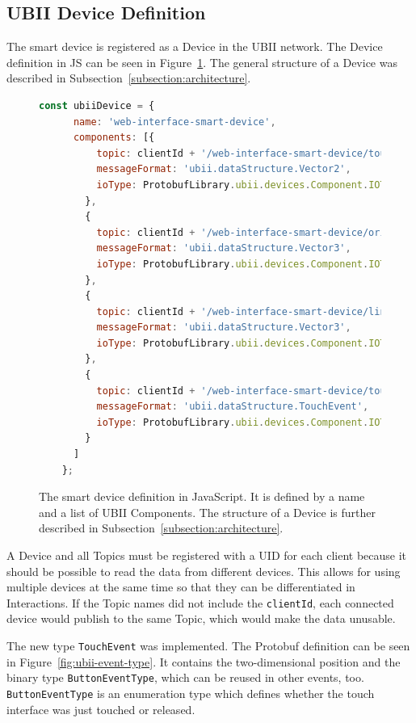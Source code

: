 \subsection{UBII Device Definition}\label{subsection:ubii-device-definition}

The smart device is registered as a Device in the \gls{UBII} network. The Device definition in \gls{JS} can be seen in Figure~\ref{fig:ubii-device-registration}. The general structure of a Device was described in Subsection~\ref{subsection:architecture}.

\begin{figure}[H]
	\begin{lstlisting}[language=JavaScript]
    const ubiiDevice = {
      name: 'web-interface-smart-device',
      components: [{
          topic: clientId + '/web-interface-smart-device/touch_position',
          messageFormat: 'ubii.dataStructure.Vector2',
          ioType: ProtobufLibrary.ubii.devices.Component.IOType.INPUT
        },
        {
          topic: clientId + '/web-interface-smart-device/orientation',
          messageFormat: 'ubii.dataStructure.Vector3',
          ioType: ProtobufLibrary.ubii.devices.Component.IOType.INPUT
        },
        {
          topic: clientId + '/web-interface-smart-device/linear_acceleration',
          messageFormat: 'ubii.dataStructure.Vector3',
          ioType: ProtobufLibrary.ubii.devices.Component.IOType.INPUT
        },
        {
          topic: clientId + '/web-interface-smart-device/touch_events',
          messageFormat: 'ubii.dataStructure.TouchEvent',
          ioType: ProtobufLibrary.ubii.devices.Component.IOType.INPUT
        }
      ]
    };
  \end{lstlisting}
	\caption[Protobuf definition of the smart device]{The smart device definition in JavaScript. It is defined by a name and a list of \gls{UBII} Components. The structure of a Device is further described in Subsection~\ref{subsection:architecture}.}\label{fig:ubii-device-registration}
\end{figure}

A Device and all Topics must be registered with a \gls{UID} for each client because it should be possible to read the data from different devices. This allows for using multiple devices at the same time so that they can be differentiated in Interactions. If the Topic names did not include the \lstinline{clientId}, each connected device would publish to the same Topic, which would make the data unusable.

The new type \lstinline{TouchEvent} was implemented. The \gls{Protobuf} definition can be seen in Figure~\ref{fig:ubii-event-type}. It contains the two-dimensional position and the binary type \mbox{\lstinline{ButtonEventType},} which can be reused in other events, too. \lstinline{ButtonEventType} is an enumeration type which defines whether the touch interface was just touched or released.

